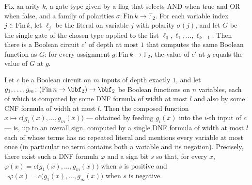 \begin{lemma}
\label{LMN.build_literal_circuit}
\leanok
{}
Fix an arity $k$, a gate type given by a flag that selects AND when true and OR when
false, and a family of polarities $\sigma : \mathrm{Fin}\,k \to \mathbb{F}_2$. For each
variable index $j \in \mathrm{Fin}\,k$, let $\ell_j$ be the literal on variable $j$ with
polarity $\sigma(j)$, and let $G$ be the single gate of the chosen type applied to the
list $\ell_0, \ell_1, \dots, \ell_{k-1}$. Then there is a Boolean circuit $c'$ of depth
at most $1$ that computes the same Boolean function as $G$: for every assignment $g :
\mathrm{Fin}\,k \to \mathbb{F}_2$, the value of $c'$ at $g$ equals the value of $G$ at
$g$.
\end{lemma}

\begin{lemma}
\label{LMN.exists_circuit_depth_reduction_depth1}
\leanok
{}
Let $c$ be a Boolean circuit on $m$ inputs of depth exactly $1$, and let $g_1,\dots,g_m
\colon (\mathrm{Fin}\,n \to \bbf_2) \to \bbf_2$ be Boolean functions on $n$ variables,
each of which is computed by some DNF formula of width at most $l$ and also by some CNF
formula of width at most $l$. Then the composed function $x \mapsto
c\big(g_1(x),\dots,g_m(x)\big)$ — obtained by feeding $g_i(x)$ into the $i$-th input of
$c$ — is, up to an overall sign, computed by a single DNF formula of width at most $l$
each of whose terms has no repeated literal and mentions every variable at most once (in
particular no term contains both a variable and its negation). Precisely, there exist
such a DNF formula $\varphi$ and a sign bit $s$ so that, for every $x$, $\varphi(x) =
c\big(g_1(x),\dots,g_m(x)\big)$ when $s$ is positive and $\lnot\varphi(x) =
c\big(g_1(x),\dots,g_m(x)\big)$ when $s$ is negative.
\end{lemma}

